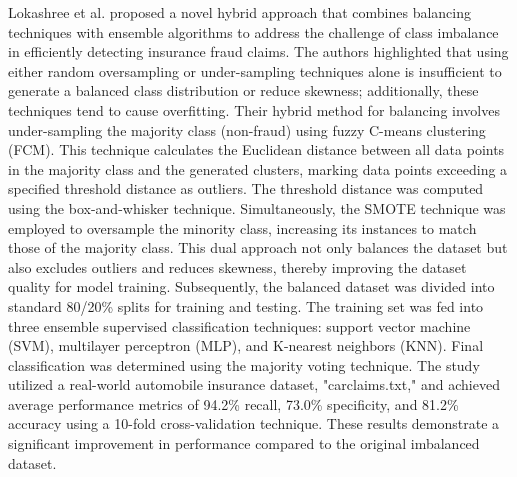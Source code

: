 \documentclass[twoside,11pt]{article}
\begin{document}
Lokashree et al. \cite{Padhi2020} proposed a novel hybrid approach that combines balancing techniques with ensemble algorithms to address the challenge of class imbalance in efficiently detecting insurance fraud claims. The authors highlighted that using either random oversampling or under-sampling techniques alone is insufficient to generate a balanced class distribution or reduce skewness; additionally, these techniques tend to cause overfitting. Their hybrid method for balancing involves under-sampling the majority class (non-fraud) using fuzzy C-means clustering (FCM). This technique calculates the Euclidean distance between all data points in the majority class and the generated clusters, marking data points exceeding a specified threshold distance as outliers. The threshold distance was computed using the box-and-whisker technique. Simultaneously, the SMOTE technique was employed to oversample the minority class, increasing its instances to match those of the majority class. This dual approach not only balances the dataset but also excludes outliers and reduces skewness, thereby improving the dataset quality for model training. Subsequently, the balanced dataset was divided into standard 80/20\% splits for training and testing. The training set was fed into three ensemble supervised classification techniques: support vector machine (SVM), multilayer perceptron (MLP), and K-nearest neighbors (KNN). Final classification was determined using the majority voting technique. The study utilized a real-world automobile insurance dataset, "carclaims.txt," and achieved average performance metrics of 94.2\% recall, 73.0\% specificity, and 81.2\% accuracy using a 10-fold cross-validation technique. These results demonstrate a significant improvement in performance compared to the original imbalanced dataset.
\end{document}
